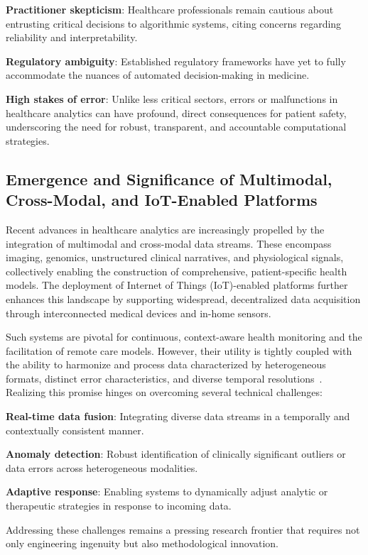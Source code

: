 \documentclass[sigconf]{acmart}
\begin{document}
\textbf{Practitioner skepticism}: Healthcare professionals remain cautious about entrusting critical decisions to algorithmic systems, citing concerns regarding reliability and interpretability.

\textbf{Regulatory ambiguity}: Established regulatory frameworks have yet to fully accommodate the nuances of automated decision-making in medicine.

\textbf{High stakes of error}: Unlike less critical sectors, errors or malfunctions in healthcare analytics can have profound, direct consequences for patient safety, underscoring the need for robust, transparent, and accountable computational strategies.

\subsection{Emergence and Significance of Multimodal, Cross-Modal, and IoT-Enabled Platforms}

Recent advances in healthcare analytics are increasingly propelled by the integration of multimodal and cross-modal data streams. These encompass imaging, genomics, unstructured clinical narratives, and physiological signals, collectively enabling the construction of comprehensive, patient-specific health models. The deployment of Internet of Things (IoT)-enabled platforms further enhances this landscape by supporting widespread, decentralized data acquisition through interconnected medical devices and in-home sensors.

Such systems are pivotal for continuous, context-aware health monitoring and the facilitation of remote care models. However, their utility is tightly coupled with the ability to harmonize and process data characterized by heterogeneous formats, distinct error characteristics, and diverse temporal resolutions~\cite{ref91,ref92,ref106}. Realizing this promise hinges on overcoming several technical challenges:

\textbf{Real-time data fusion}: Integrating diverse data streams in a temporally and contextually consistent manner.

\textbf{Anomaly detection}: Robust identification of clinically significant outliers or data errors across heterogeneous modalities.

\textbf{Adaptive response}: Enabling systems to dynamically adjust analytic or therapeutic strategies in response to incoming data.

Addressing these challenges remains a pressing research frontier that requires not only engineering ingenuity but also methodological innovation.
\end{document}
